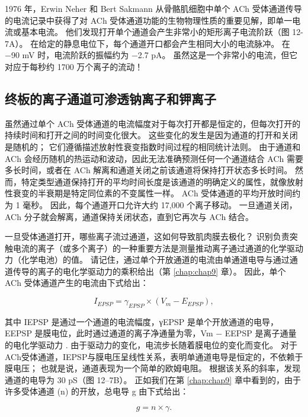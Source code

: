 1976 年，Erwin Neher 和 Bert Sakmann 从骨骼肌细胞中单个 ACh 受体通道传导的电流记录中获得了对 ACh 受体通道功能的生物物理性质的重要见解，即单一电流或基本电流。 
他们发现打开单个通道会产生非常小的矩形离子电流阶跃（图 12-7A）。
在给定的静息电位下，每个通道开口都会产生相同大小的电流脉冲。
在 −90 mV 时，电流阶跃的振幅约为 −2.7 pA。 
虽然这是一个非常小的电流，但它对应于每秒约 1700 万个离子的流动！




\subsection{终板的离子通道可渗透钠离子和钾离子}
虽然通过单个 ACh 受体通道的电流幅度对于每次打开都是恒定的，但每次打开的持续时间和打开之间的时间变化很大。 
这些变化的发生是因为通道的打开和关闭是随机的； 
它们遵循描述放射性衰变指数时间过程的相同统计法则。 
由于通道和 ACh 会经历随机的热运动和波动，因此无法准确预测任何一个通道结合 ACh 需要多长时间，或者在 ACh 解离和通道关闭之前该通道将保持打开状态多长时间。 
然而，特定类型通道保持打开的平均时间长度是该通道的明确定义的属性，就像放射性衰变的半衰期是特定同位素的不变属性一样。 ACh 受体通道的平均开放时间约为 1 毫秒。 
因此，每个通道开口允许大约 17,000 个离子移动。 
一旦通道关闭，ACh 分子就会解离，通道保持关闭状态，直到它再次与 ACh 结合。


一旦受体通道打开，哪些离子流过通道，这如何导致肌肉膜去极化？
识别负责突触电流的离子（或多个离子）的一种重要方法是测量推动离子通过通道的化学驱动力（化学电池）的值。
请记住，通过单个开放通道的电流由单通道电导与通过通道传导的离子的电化学驱动力的乘积给出（第 \ref{chap:chap9} 章）。 
因此，单个 ACh 受体通道产生的电流由下式给出：


\begin{equation}
	I_{EPSP} = \gamma_{EPSP}\times (V_m - E_{EPSP}),
\end{equation}

其中 IEPSP 是通过一个通道的电流幅度，γEPSP 是单个开放通道的电导，EEPSP 是膜电位，此时通过通道的离子净通量为零，Vm − EEPSP 是离子通量的电化学驱动力 . 由于驱动力的变化，电流步长随着膜电位的变化而变化。 
对于ACh受体通道，IEPSP与膜电压呈线性关系，表明单通道电导是恒定的，不依赖于膜电压； 也就是说，通道表现为一个简单的欧姆电阻。 
根据该关系的斜率，发现通道的电导为 30 pS（图 12–7B）。 
正如我们在第 \ref{chap:chap9} 章中看到的，由于许多受体通道 (n) 的开放，总电导 g 由下式给出：

\begin{equation}
	g = n \times \gamma.
\end{equation}

